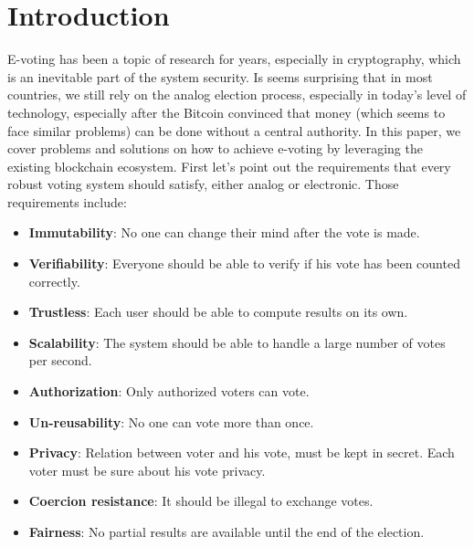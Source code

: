 \documentclass[runningheads]{llncs}
\begin{document}
\section{Introduction}
E-voting has been a topic of research for years, especially in cryptography, which is an inevitable part of the system security. Is seems surprising that in most countries, we still rely on the analog election process, especially in today's level of technology, especially after the Bitcoin convinced that money (which seems to face similar problems) can be done without a central authority. In this paper, we cover problems and solutions on how to achieve e-voting by leveraging the existing blockchain ecosystem. 
First let's point out the requirements that every robust voting system should satisfy, either analog or electronic. Those requirements include:
\begin{itemize}
\item \textbf{Immutability}: No one can change their mind after the vote is made.
\item \textbf{Verifiability}: Everyone should be able to verify if his vote has been counted correctly.
\item \textbf{Trustless}: Each user should be able to compute results on its own.
\item \textbf{Scalability}: The system should be able to handle a large number of votes per second.
\item \textbf{Authorization}: Only authorized voters can vote.
\item \textbf{Un-reusability}: No one can vote more than once.
\item \textbf{Privacy}: Relation between voter and his vote, must be kept in secret. Each voter must be sure about his vote privacy. 
\item \textbf{Coercion resistance}: It should be illegal to exchange votes.
\item \textbf{Fairness}: No partial results are available until the end of the election.
\end{itemize}
\end{document}
